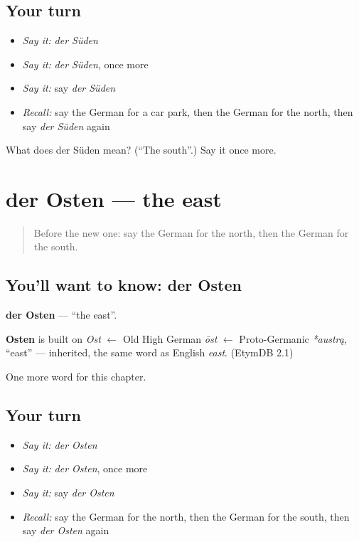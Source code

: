 \subsection*{Your turn}
\begin{itemize}
\raggedright
  \item \emph{Say it:} \emph{der Süden}
  \item \emph{Say it:} \emph{der Süden}, once more
  \item \emph{Say it:} say \emph{der Süden}
  \item \emph{Recall:} say the German for a car park, then the German for the north, then say \emph{der Süden} again
\end{itemize}

\begin{tcolorbox}[breakable,colback=teal!4,colframe=teal!35!black,title={Before you move on}]
What does der Süden mean? (\textquotedblleft{}The south\textquotedblright{}.) Say it once more.
\end{tcolorbox}
\section[der Osten]{der Osten — the east}

\label{lesson:GE-C108-osten}



\begin{quote}
Before the new one: say the German for the north, then the German for the south.
\end{quote}

\subsection*{You'll want to know: der Osten}
\textbf{der Osten} — \textquotedblleft{}the east\textquotedblright{}.

\begin{cousinweb}
\textbf{Osten} is built on \emph{Ost} $\leftarrow$ Old High German \emph{ōst} $\leftarrow$ Proto-Germanic \emph{*austrą}, \textquotedblleft{}east\textquotedblright{} — inherited, the same word as English \emph{east}. (EtymDB 2.1)
\end{cousinweb}

\begin{grammarlens}[title={What you've built}]
One more word for this chapter.
\end{grammarlens}

\subsection*{Your turn}
\begin{itemize}
\raggedright
  \item \emph{Say it:} \emph{der Osten}
  \item \emph{Say it:} \emph{der Osten}, once more
  \item \emph{Say it:} say \emph{der Osten}
  \item \emph{Recall:} say the German for the north, then the German for the south, then say \emph{der Osten} again
\end{itemize}

